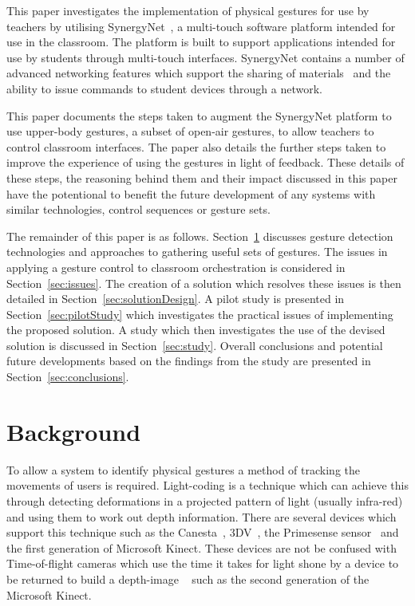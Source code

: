 \documentclass[link]{IWCOMP}
\begin{document}
This paper investigates the implementation of physical gestures for use by teachers by utilising SynergyNet~\citep{HatchA.HigginsSMercier2009}, a multi-touch software platform intended for use in the classroom.
The platform is built to support applications intended for use by students through multi-touch interfaces.
SynergyNet contains a number of advanced networking features which support the sharing of materials~\citep{mcnaughton-et-al:jce2017} and the ability to issue commands to student devices through a network.

This paper documents the steps taken to augment the SynergyNet platform to use upper-body gestures, a subset of open-air gestures, to allow teachers to control classroom interfaces.
The paper also details the further steps taken to improve the experience of using the gestures in light of feedback.
These details of these steps, the reasoning behind them and their impact discussed in this paper have the potentional to benefit the future development of any systems with similar technologies, control sequences or gesture sets.

The remainder of this paper is as follows. 
Section~\ref{sec:background} discusses gesture detection technologies and approaches to gathering useful sets of gestures.
The issues in applying a gesture control to classroom orchestration is considered in Section~\ref{sec:issues}.
The creation of a solution which resolves these issues is then detailed in Section~\ref{sec:solutionDesign}.
A pilot study is presented in Section~\ref{sec:pilotStudy} which investigates the practical issues of implementing the proposed solution.
A study which then investigates the use of the devised solution is discussed in Section~\ref{sec:study}.
Overall conclusions and potential future developments based on the findings from the study are presented in Section~\ref{sec:conclusions}.

\section{Background} 
\label{sec:background}


To allow a system to identify physical gestures a method of tracking the movements of users is required.
Light-coding is a technique which can achieve this through detecting deformations in a projected pattern of light (usually infra-red) and using them to work out depth information.
There are several devices which support this technique such as the Canesta~\citep{Yang2007}, 3DV~\citep{Wilson2007a}, the Primesense sensor~\citep{Wilson2010} and the first generation of Microsoft Kinect.
These devices are not be confused with Time-of-flight cameras which use the time it takes for light shone by a device to be returned to build a depth-image ~\citep{Lange2001} such as the second generation of the Microsoft Kinect.
\end{document}
